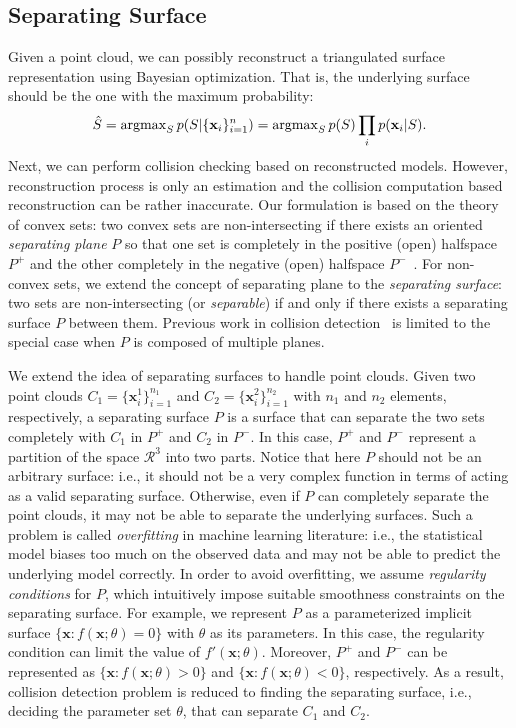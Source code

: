\subsection{Separating Surface}
\label{sec:7:overview:2}
Given a point cloud, we can possibly reconstruct a triangulated surface representation using Bayesian optimization. That is, the underlying surface should be the one with the maximum probability:
\begin{equation}
\hat{S} = \operatorname{argmax}_S p(S|\{\mathbf x_i\}_{i=1}^n) = \operatorname{argmax}_S p(S) \prod_i p(\mathbf x_i | S).
\end{equation}
Next, we can perform collision checking based on reconstructed models. However, reconstruction process is only an estimation and the
collision computation based reconstruction can be rather inaccurate.
Our formulation is based on the theory of convex sets: two convex sets are non-intersecting if there exists an oriented \emph{separating plane} $P$ so that one set is completely in the positive (open) halfspace $P^+$ and the other completely in the negative (open) halfspace $P^-$~\cite{Mount:2004}. For non-convex sets, we extend the concept of separating plane to the \emph{separating surface}: two sets are non-intersecting (or \emph{separable}) if and only if there exists a separating surface $P$ between them. Previous work in collision detection~\cite{Mount:2004, Ponamgi:1995} is limited to the special case when $P$ is composed of multiple planes.

We extend the idea of separating surfaces to handle point clouds. Given two point clouds $C_1 = \{\mathbf x_i^1\}_{i=1}^{n_1}$ and $C_2 = \{\mathbf x_i^2\}_{i=1}^{n_2}$
with $n_1$ and $n_2$ elements, respectively, a separating surface $P$ is a surface that can separate the two sets completely with $C_1$ in $P^+$ and $C_2$ in $P^-$.
In this case, $P^+$ and $P^-$ represent a partition of the space $\mathcal{R}^3$ into two parts. Notice that here $P$ should not be an
arbitrary surface: i.e., it should not be a very complex function in terms of acting as a valid separating surface. Otherwise, even if $P$ can completely separate the point clouds, it may not be able to separate the underlying surfaces. Such a problem is called \emph{overfitting} in machine learning literature: i.e., the statistical model biases too much on the observed data and may not be able to predict the underlying model correctly. In order to avoid overfitting, we assume \emph{regularity conditions} for $P$, which intuitively impose suitable smoothness constraints on the separating surface. For example, we represent $P$ as a parameterized implicit surface $\{\mathbf x: f(\mathbf x; \theta) = 0\}$ with $\theta$ as its parameters. In this case, the regularity condition can limit the value of $f'(\mathbf x; \theta)$. Moreover, $P^+$ and $P^-$ can be represented as $\{\mathbf x: f(\mathbf x; \theta) > 0\}$ and $\{\mathbf x: f(\mathbf x; \theta) < 0\}$, respectively. As a result, collision detection problem is reduced to finding the separating surface, i.e., deciding the parameter set $\theta$, that can separate $C_1$ and $C_2$.

